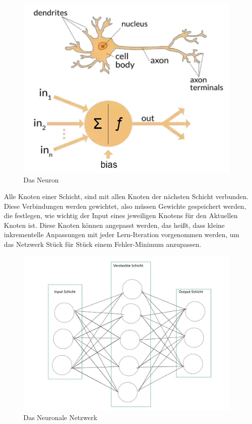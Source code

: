 \documentclass[12pt]{article}
\begin{document}
\begin{figure}[H]
\centering
\includegraphics[scale=0.40]{./Images/BA_001_DasNeuron.png}
\caption{Das Neuron}
\label{Das Neuron}
\end{figure}

Alle Knoten einer Schicht, sind mit allen Knoten der nächsten Schicht verbunden. Diese Verbindungen werden gewichtet, also müssen Gewichte gespeichert werden, die festlegen, wie wichtig der Input eines jeweiligen Knotens für den Aktuellen Knoten ist. Diese Knoten können angepasst werden, das heißt, dass kleine inkrementelle Anpassungen mit jeder Lern-Iteration vorgenommen werden, um das Netzwerk Stück für Stück einem Fehler-Minimum anzupassen. 

\begin{figure}[H]
\centering
\includegraphics[scale=0.50]{./Images/BA_002_FeedForwardNetzwerk.jpg}
\caption{Das Neuronale Netzwerk}
\label{Das Neuronale Netzwerk}
\end{figure}
\end{document}
